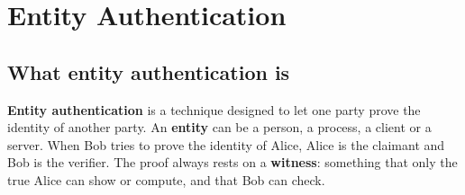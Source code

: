 \section{Entity Authentication}\label{sec:entityauth}
\providecommand{\eaHeads}[4]{\node[eaparty] at (0,0.6) {#1}; \node[eaparty] at (#3,0.6) {#2};
  \draw[gray!70, thick] (0,0.12) -- (0,#4); \draw[gray!70, thick] (#3,0.12) -- (#3,#4);}
\providecommand{\eaR}[4]{\draw[eamsg] (0,#1) -- node[ealab]{#3} (#4,#1); \node[eanum] at (0,#1) {#2};}
\providecommand{\eaL}[4]{\draw[eamsg] (#4,#1) -- node[ealab]{#3} (0,#1); \node[eanum] at (#4,#1) {#2};}
\providecommand{\eaA}{Alice\\[-2pt]{\footnotesize\mdseries (claimant)}}
\providecommand{\eaB}{Bob\\[-2pt]{\footnotesize\mdseries (verifier)}}

\subsection{What entity authentication is \new}

\textbf{Entity authentication} is a technique designed to let one party prove the identity of another party. An \textbf{entity} can be a person, a process, a client or a server.  When Bob tries to prove the identity of Alice, Alice is the claimant and Bob is the verifier. The proof always rests on a \textbf{witness}: something that only the true Alice can show or compute, and that Bob can check.

